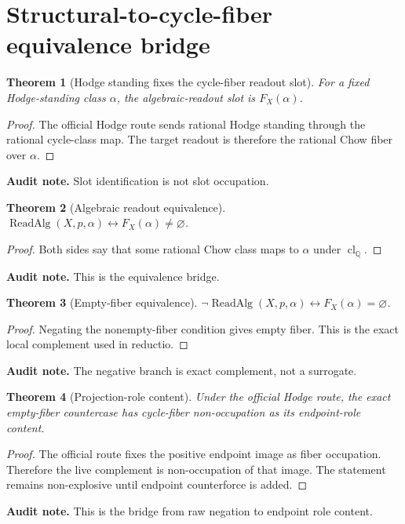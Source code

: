 \documentclass[11pt]{article}
\newtheorem{theorem}{Theorem}[section]
\newcommand{\QQ}{\mathbb{Q}}
\newcommand{\clQ}{\operatorname{cl}_{\QQ}}
\newcommand{\ReadAlg}{\operatorname{ReadAlg}}
\begin{document}
\section{Structural-to-cycle-fiber equivalence bridge}


\begin{theorem}[Hodge standing fixes the cycle-fiber readout slot]
For a fixed Hodge-standing class $\alpha$, the algebraic-readout slot is $F_X(\alpha)$.
\end{theorem}
\begin{proof}
The official Hodge route sends rational Hodge standing through the rational cycle-class map. The target readout is therefore the rational Chow fiber over $\alpha$.
\end{proof}
\par\noindent\textbf{Audit note.} Slot identification is not slot occupation.


\begin{theorem}[Algebraic readout equivalence]
$\ReadAlg(X,p,\alpha)\leftrightarrow F_X(\alpha)\neq\varnothing$.
\end{theorem}
\begin{proof}
Both sides say that some rational Chow class maps to $\alpha$ under $\clQ$.
\end{proof}
\par\noindent\textbf{Audit note.} This is the equivalence bridge.


\begin{theorem}[Empty-fiber equivalence]
$\neg\ReadAlg(X,p,\alpha)\leftrightarrow F_X(\alpha)=\varnothing$.
\end{theorem}
\begin{proof}
Negating the nonempty-fiber condition gives empty fiber. This is the exact local complement used in reductio.
\end{proof}
\par\noindent\textbf{Audit note.} The negative branch is exact complement, not a surrogate.


\begin{theorem}[Projection-role content]
Under the official Hodge route, the exact empty-fiber countercase has cycle-fiber non-occupation as its endpoint-role content.
\end{theorem}
\begin{proof}
The official route fixes the positive endpoint image as fiber occupation. Therefore the live complement is non-occupation of that image. The statement remains non-explosive until endpoint counterforce is added.
\end{proof}
\par\noindent\textbf{Audit note.} This is the bridge from raw negation to endpoint role content.
\end{document}
